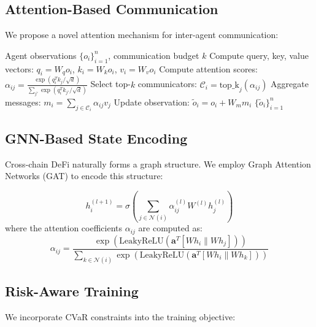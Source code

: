 \documentclass[11pt,a4paper]{article}
\begin{document}
\subsection{Attention-Based Communication}

We propose a novel attention mechanism for inter-agent communication:

\begin{algorithm}[H]
\caption{Attention-Based Communication Module}
\label{alg:attention}
\begin{algorithmic}[1]
\Require Agent observations $\{o_i\}_{i=1}^n$, communication budget $k$
\State Compute query, key, value vectors: $q_i = W_q o_i$, $k_i = W_k o_i$, $v_i = W_v o_i$
\State Compute attention scores: $\alpha_{ij} = \frac{\exp(q_i^T k_j / \sqrt{d})}{\sum_{j'} \exp(q_i^T k_{j'} / \sqrt{d})}$
\State Select top-$k$ communicators: $\mathcal{C}_i = \text{top\_k}_j(\alpha_{ij})$
\State Aggregate messages: $m_i = \sum_{j \in \mathcal{C}_i} \alpha_{ij} v_j$
\State Update observation: $\tilde{o}_i = o_i + W_m m_i$
\State \Return $\{\tilde{o}_i\}_{i=1}^n$
\end{algorithmic}
\end{algorithm}

\subsection{GNN-Based State Encoding}

Cross-chain DeFi naturally forms a graph structure. We employ Graph Attention Networks (GAT) to encode this structure:

\begin{equation}\label{eq:gnn}
h_i^{(l+1)} = \sigma\left( \sum_{j \in \mathcal{N}(i)} \alpha_{ij}^{(l)} W^{(l)} h_j^{(l)} \right)
\end{equation}
where the attention coefficients $\alpha_{ij}$ are computed as:
\begin{equation}
\alpha_{ij} = \frac{\exp\left( \text{LeakyReLU}\left( \mathbf{a}^T [W h_i \| W h_j] \right) \right)}{\sum_{k \in \mathcal{N}(i)} \exp\left( \text{LeakyReLU}\left( \mathbf{a}^T [W h_i \| W h_k] \right) \right)}
\end{equation}

\subsection{Risk-Aware Training}

We incorporate CVaR constraints into the training objective:
\end{document}
